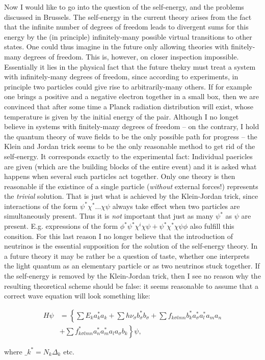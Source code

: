 \documentclass{article}
\newcommand{\nequ}[2]{
\begin{align*}
#1
\tag{#2}
\end{align*}
}
\begin{document}
Now I would like to go into the question of the self-energy, and the problems discussed in Brussels. The self-energy in the current theory arises from the fact that the infinite number of degrees of freedom leads to divergent sums for this energy by the (in principle) infinitely-many possible virtual transitions to other states. One could thus imagine in the future only allowing theories with finitely-many degrees of freedom. This is, however, on closer inspection impossible. Essentially it lies in the physical fact that the future thekry must treat a system with infinitely-many degrees of freedom, since according to experiments, in principle two particles could give rise to arbitrarily-many others. If for example one brings a positive and a negative electron together in a small box, then we are convinced that after some time a Planck radiation distribution will exist, whose temperature is given by the initial energy of the pair.
Although I no longet believe in systems with finitely-many degrees of freedom -- on the contrary, I hold the quantum theory of wave fields to be the only possible path for progress -- the Klein and Jordan trick seems to be the only reasonable method to get rid of the self-energy. It corresponds exactly to the experimental fact: Individual paericles are given (which are the building blocks of the entire event) and it is asked what happens when several such particles act together. Only one theory is then reasonable if the existince of a single particle (\textit{without} external forces!) represents the \textit{trivial} solution. That is just what is achieved by the Klein-Jordan trick, since interactions of the form $\psi^*\chi^*\dots\chi\psi$ always take effect when two particles are simultaneously present. Thus it is \textit{not} important that just as many $\psi^*$ as $\psi$ are present. E.g. expressions of the form $\phi^*\psi^*\chi^i\chi\psi + \psi^*\chi^*\chi\psi\phi$ also fulfill this consition. For this last reason I no longer believe that the introduction of neutrinos is the essential supposition for the solution of the self-energy theory. In a future theory it may be rather be a question of taste, whether one interprets the light quantum as an elementary particle or as two neutrinos stuck together.
If the self-energy is removed by the Klein-Jordan trick, then I see no reason why the resulting theoretical scheme should be false: it seems reasonable to assume that a correct wave equation will look something like:
\nequ{
H\psi &= \left\{\sum{E_k a_k^* a_k} + \sum{h\nu_\sigma b_\sigma^* b_\sigma} + 
\sum{f_{k\sigma lmn}b_k^* a_\sigma^* a_l^* a_m a_n}\right.\\
&\left.+ \sum{f^*_{k\sigma lmn}a_n^* a_m^* a_l a_\sigma b_k}
\right\}\psi,
}{2}
where $\_k^* = N_k \Delta_k$ etc.
\end{document}

